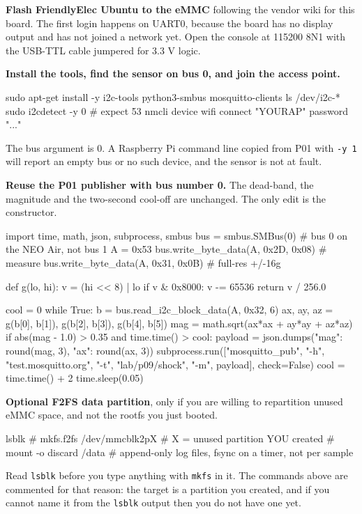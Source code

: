 \begin{steps}
\item \textbf{Flash FriendlyElec Ubuntu to the eMMC} following the vendor wiki for this board. The first login happens on UART0, because the board has no display output and has not joined a network yet. Open the console at 115200 8N1 with the USB-TTL cable jumpered for 3.3 V logic.

\item \textbf{Install the tools, find the sensor on bus 0, and join the access point.}
\begin{shellcode}
sudo apt-get install -y i2c-tools python3-smbus mosquitto-clients
ls /dev/i2c-*
sudo i2cdetect -y 0         # expect 53
nmcli device wifi connect "YOURAP" password "..."
\end{shellcode}
The bus argument is 0. A Raspberry Pi command line copied from P01 with \texttt{-y 1} will report an empty bus or no such device, and the sensor is not at fault.

\item \textbf{Reuse the P01 publisher with bus number 0.} The dead-band, the magnitude and the two-second cool-off are unchanged. The only edit is the constructor.
\begin{pycode}
import time, math, json, subprocess, smbus
bus = smbus.SMBus(0)                 # bus 0 on the NEO Air, not bus 1
A = 0x53
bus.write_byte_data(A, 0x2D, 0x08)   # measure
bus.write_byte_data(A, 0x31, 0x0B)   # full-res +/-16g

def g(lo, hi):
    v = (hi << 8) | lo
    if v & 0x8000:
        v -= 65536
    return v / 256.0

cool = 0
while True:
    b = bus.read_i2c_block_data(A, 0x32, 6)
    ax, ay, az = g(b[0], b[1]), g(b[2], b[3]), g(b[4], b[5])
    mag = math.sqrt(ax*ax + ay*ay + az*az)
    if abs(mag - 1.0) > 0.35 and time.time() > cool:
        payload = json.dumps({"mag": round(mag, 3), "ax": round(ax, 3)})
        subprocess.run(["mosquitto_pub", "-h", "test.mosquitto.org",
                        "-t", "lab/p09/shock", "-m", payload], check=False)
        cool = time.time() + 2
    time.sleep(0.05)
\end{pycode}

\item \textbf{Optional F2FS data partition}, only if you are willing to repartition unused eMMC space, and not the rootfs you just booted.
\begin{shellcode}
lsblk
# mkfs.f2fs /dev/mmcblk2pX     # X = unused partition YOU created
# mount -o discard /data
# append-only log files, fsync on a timer, not per sample
\end{shellcode}
Read \texttt{lsblk} before you type anything with \texttt{mkfs} in it. The commands above are commented for that reason: the target is a partition you created, and if you cannot name it from the \texttt{lsblk} output then you do not have one yet.


\end{steps}
